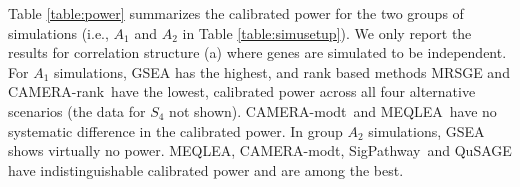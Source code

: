 \documentclass[useAMS,usenatbib, galley]{biom}
\newcommand{\OurMethod}{MEQLEA}
\newcommand{\aaCase}{a}
\newcommand{\CMR}{CAMERA-rank}
\newcommand{\CMT}{CAMERA-modt}
\newcommand{\gent}{SigPathway}
\begin{document}
	Table \ref{table:power} summarizes the calibrated power for the two groups of simulations (i.e., $A_1$ and $A_2$ in Table \ref{table:simusetup}). We only report the results for correlation structure (\aaCase) where genes are simulated to be independent. %
	For $A_1$ simulations, GSEA has the highest, and rank based methods MRSGE and \CMR~have the lowest, calibrated power across all four alternative scenarios (the data for $S_4$ not shown). \CMT~and \OurMethod~have no systematic difference in the calibrated power. %
	 In group $A_2$ simulations, GSEA shows virtually no power. \OurMethod, \CMT, \gent~and QuSAGE have indistinguishable calibrated power and are among the best. 	
\end{document}
